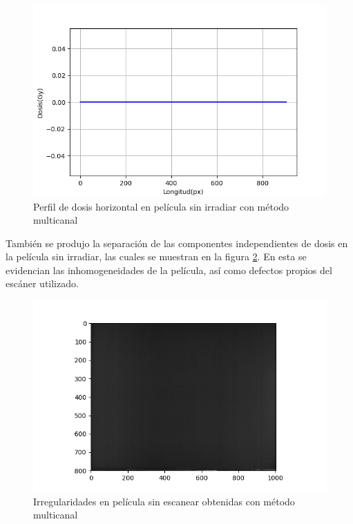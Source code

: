 \begin{figure}[H]
	\centering
	\includegraphics[width=0.7\linewidth]{images/perfilHorizontalDeDosisCeroMulticanal.png}
	\caption{Perfil de dosis horizontal en película sin irradiar con método multicanal }
	\label{fig:perfilCero}
\end{figure}

También se produjo la separación de las componentes independientes de dosis en la película sin irradiar, las cuales se muestran en la figura \ref{fig:irregularCero}. En esta se evidencian las inhomogeneidades de la película, así como defectos propios del escáner utilizado.\\ 
\begin{figure}[H]
	\centering
	\includegraphics[width=0.7\linewidth]{images/fondoIndependienteDosisPeliculaCero.png}
	\caption{Irregularidades en película sin escanear obtenidas con método multicanal }
	\label{fig:irregularCero}
\end{figure}

